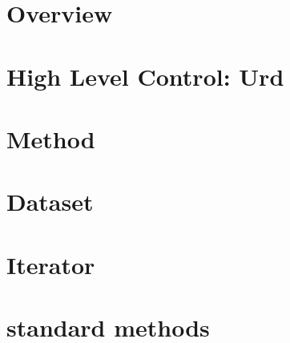 \documentclass[a4paper]{report}
\begin{document}






\chapter{Overview}


\chapter{High Level Control:  Urd}


\chapter{Method}


\chapter{Dataset}


\chapter{Iterator}


\chapter{standard methods}


%
\end{document}
